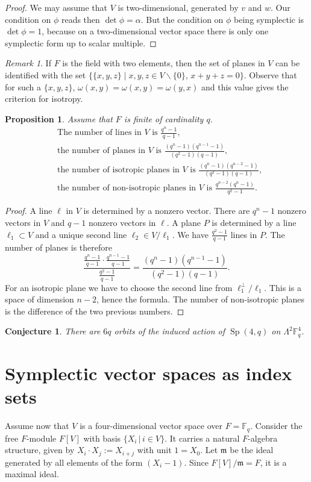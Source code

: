 \documentclass{amsart}
\DeclareMathOperator{\Sp}{Sp}
\theoremstyle{plain}
\newtheorem{proposition}[theorem]{Proposition}
\newtheorem{conjecture}[theorem]{Conjecture}
\theoremstyle{definition}
\theoremstyle{remark}
\newtheorem{remark}[theorem]{Remark}
\begin{document}
\begin{proof}
We may assume that $V$ is two-dimensional, generated by $v$ and $w$. Our condition on $\phi$ reads then $\det\phi = \alpha$. But the condition on $\phi$ being symplectic is $\det\phi = 1$, because on a two-dimensional vector space there is only one symplectic form up to scalar multiple. 
\end{proof}
\begin{remark}
 If $F$ is the field with two elements, then the set of planes in $V$ can be identified with the set $\{\{x,y,z\}\;|\;x,y,z\in V\backslash\{0\},\,x+y+z=0\}$. Observe that for such a $\{x,y,z\}$, $\omega(x,y)=\omega(x,y)=\omega(y,x)$ and this value gives the criterion for isotropy.
\end{remark}

\begin{proposition} Assume that $F$ is finite of cardinality $q$.
\begin{align}
&\text{The number of lines in $V$ is }\frac{q^n-1}{q-1}, \\
&\text{the number of planes in $V$ is }\frac{(q^n-1)(q^{n-1}-1)}{(q^2-1)(q-1)}, \\
&\text{the number of isotropic planes in $V$ is }\frac{(q^n-1)(q^{n-2}-1)}{(q^2-1)(q-1)}, \\
&\text{the number of non-isotropic planes in $V$ is }\frac{q^{n-2}(q^n-1)}{q^2-1}.
\end{align}
\end{proposition}
\begin{proof}
A line $\ell$ in $V$ is determined by a nonzero vector. There are $q^n - 1$ nonzero vectors in $V$ and $q-1$ nonzero vectors in $\ell$. A plane $P$ is determined by a line $\ell_1 \subset V$ and a unique second line $\ell_2\in V/\ell_1$. We have $\frac{q^2-1}{q-1}$ lines in $P$. The number of planes is therefore
$$
\frac{ \frac{q^n-1}{q-1} \cdot\frac{q^{n-1}-1}{q-1}}{\frac{q^2-1}{q-1} } = \frac{(q^n-1)(q^{n-1}-1)}{(q^2-1)(q-1)}.
$$
For an isotropic plane we have to choose the second line from $\ell_1^\perp/\ell_1$. This is a space of dimension $n-2$, hence the formula. The number of non-isotropic planes is the difference of the two previous numbers.
\end{proof}
\begin{conjecture}
There are $6q$ orbits of the induced action of $\Sp(4,q)$ on $\Lambda^2 \mathbb{F}_q^4$.
\end{conjecture}

\section{Symplectic vector spaces as index sets}
Assume now that $V$ is a four-dimensional vector space over $F=\mathbb F_q$. Consider the free $F$-module $F[V]$ with basis $\{X_i \,|\, i\in V\}$. It carries a natural $F$-algebra structure, given by
$X_i\cdot X_j := X_{i+j}$ with unit $1=X_0$. Let $\mathfrak m $ be the ideal generated by all elements of the form $(X_i-1)$.
Since $F[V]/\mathfrak m = F$, it is a maximal ideal.
\end{document}
